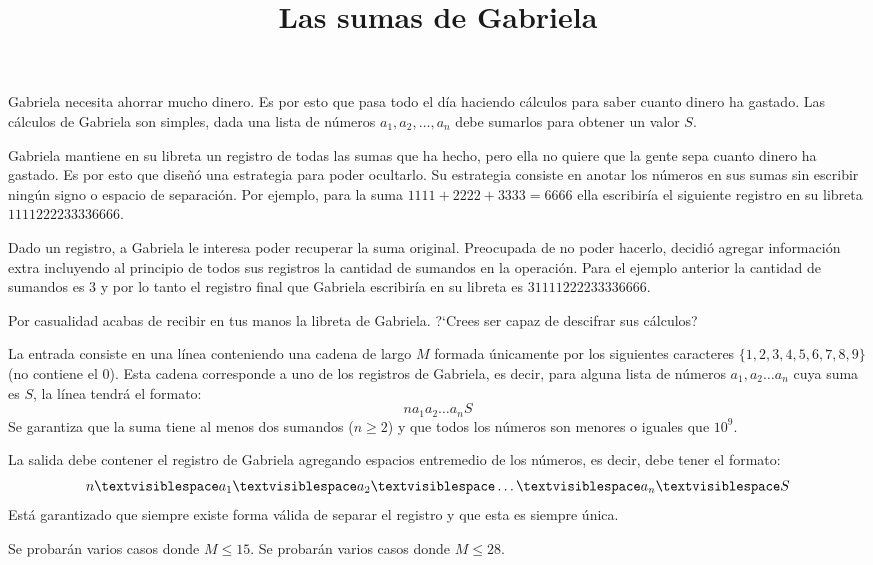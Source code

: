\documentclass{oci}
\title{Las sumas de Gabriela}
\begin{document}
\begin{problemDescription}
Gabriela necesita ahorrar mucho dinero.
Es por esto que pasa todo el día haciendo cálculos para saber cuanto dinero
ha gastado.
Las cálculos de Gabriela son simples, dada una lista de números $a_1, a_2,
\dots, a_n$ debe sumarlos para obtener un valor $S$.

Gabriela mantiene en su libreta un registro de todas las sumas que ha hecho,
pero ella no quiere que la gente sepa cuanto dinero ha gastado.
Es por esto que diseñó una estrategia para poder ocultarlo.
Su estrategia consiste en anotar los números en sus sumas sin escribir
ningún signo o espacio de separación.
Por ejemplo, para la suma $1111+2222+3333=6666$ ella escribiría el siguiente
registro en su libreta $1111222233336666$.

Dado un registro, a Gabriela le interesa poder recuperar la suma original.
Preocupada de no poder hacerlo, decidió agregar información extra incluyendo al
principio de todos sus registros la cantidad de sumandos en la operación.
Para el ejemplo anterior la cantidad de sumandos es $3$ y por lo tanto el
registro final que Gabriela escribiría en su libreta es $31111222233336666$.

Por casualidad acabas de recibir en tus manos la libreta de Gabriela.
?`Crees ser capaz de descifrar sus cálculos?
\end{problemDescription}

\begin{inputDescription}
La entrada consiste en una línea conteniendo una cadena de largo $M$ formada
únicamente por los siguientes caracteres $\{1,2,3,4,5,6,7,8,9\}$ (no contiene el
$0$).
Esta cadena corresponde a uno de los registros de Gabriela, es decir, para
alguna lista de números $a_1,a_2\dots a_n$ cuya suma es $S$, la línea tendrá el
formato:
$$n a_1 a_2 \dots a_nS$$
Se garantiza que la suma tiene al menos dos sumandos ($n\geq 2$) y que todos los
números son menores o iguales que $10^9$.
\end{inputDescription}

\begin{outputDescription}
La salida debe contener el registro de Gabriela agregando espacios 
entremedio de los números, es decir, debe tener el formato:
$$n\textvisiblespace a_1\textvisiblespace a_2\textvisiblespace
\dots\textvisiblespace a_n\textvisiblespace S$$
Está garantizado que siempre existe forma válida de separar el registro y que
esta es siempre única.
\end{outputDescription}

\begin{scoreDescription}
   Se probarán varios casos donde $M\leq 15$.
   Se probarán varios casos donde $M\leq 28$.
\end{scoreDescription}

\begin{sampleDescription}
\end{sampleDescription}
\end{document}
